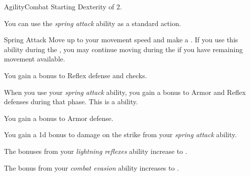     \begin{feat}{Agility}{Combat}
        \featpre Starting Dexterity of 2.

         You can use the \textit{spring attack} ability as a standard action.
        \begin{apability}{Spring Attack}
            Move up to your movement speed and make a .
            If you use this ability during the , you may continue moving during the  if you have remaining movement available.
        \end{apability}

         You gain a  bonus to Reflex defense and  checks.

         When you use your \textit{spring attack} ability, you gain a  bonus to Armor and Reflex defenses during that phase.
        This is a  ability.

         You gain a  bonus to Armor defense.

         You gain a \plus1d bonus to damage on the strike from your \textit{spring attack} ability.

         The bonuses from your \textit{lightning reflexes} ability increase to .

         The bonus from your \textit{combat evasion} ability increases to .
    \end{feat}

